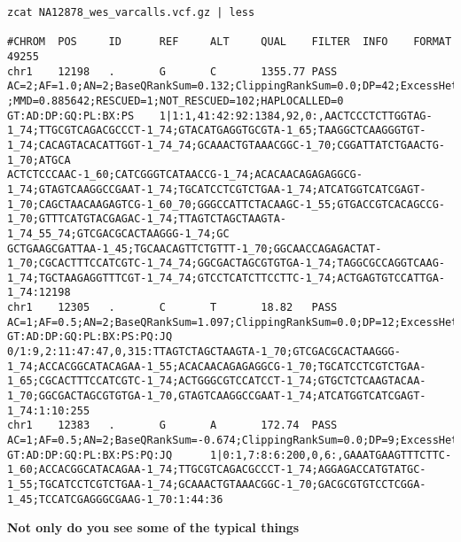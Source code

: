 \documentclass[]{article}
\begin{document}
\begin{verbatim}
zcat NA12878_wes_varcalls.vcf.gz | less

#CHROM  POS     ID      REF     ALT     QUAL    FILTER  INFO    FORMAT  49255
chr1    12198   .       G       C       1355.77 PASS    AC=2;AF=1.0;AN=2;BaseQRankSum=0.132;ClippingRankSum=0.0;DP=42;ExcessHet=3.0103;FS=0.0;MLEAC=2;MLEAF=1.0;MQ=53.23;MQRankSum=1.593;QD=32.28;ReadPosRankSum=1.653;SOR=0.286;MUMAP_REF=3.73913;MUMAP_ALT=24.775;AO=34;RO=0
;MMD=0.885642;RESCUED=1;NOT_RESCUED=102;HAPLOCALLED=0     GT:AD:DP:GQ:PL:BX:PS    1|1:1,41:42:92:1384,92,0:,AACTCCCTCTTGGTAG-1_74;TTGCGTCAGACGCCCT-1_74;GTACATGAGGTGCGTA-1_65;TAAGGCTCAAGGGTGT-1_74;CACAGTACACATTGGT-1_74_74;GCAAACTGTAAACGGC-1_70;CGGATTATCTGAACTG-1_70;ATGCA
ACTCTCCCAAC-1_60;CATCGGGTCATAACCG-1_74;ACACAACAGAGAGGCG-1_74;GTAGTCAAGGCCGAAT-1_74;TGCATCCTCGTCTGAA-1_74;ATCATGGTCATCGAGT-1_70;CAGCTAACAAGAGTCG-1_60_70;GGGCCATTCTACAAGC-1_55;GTGACCGTCACAGCCG-1_70;GTTTCATGTACGAGAC-1_74;TTAGTCTAGCTAAGTA-1_74_55_74;GTCGACGCACTAAGGG-1_74;GC
GCTGAAGCGATTAA-1_45;TGCAACAGTTCTGTTT-1_70;GGCAACCAGAGACTAT-1_70;CGCACTTTCCATCGTC-1_74_74;GGCGACTAGCGTGTGA-1_74;TAGGCGCCAGGTCAAG-1_74;TGCTAAGAGGTTTCGT-1_74_74;GTCCTCATCTTCCTTC-1_74;ACTGAGTGTCCATTGA-1_74:12198
chr1    12305   .       C       T       18.82   PASS    AC=1;AF=0.5;AN=2;BaseQRankSum=1.097;ClippingRankSum=0.0;DP=12;ExcessHet=3.0103;FS=0.0;MLEAC=1;MLEAF=0.5;MQ=51.41;MQRankSum=-0.23;QD=1.71;ReadPosRankSum=-0.253;SOR=0.086;MUMAP_REF=13.6977;MUMAP_ALT=15.6667;AO=2;RO=9;MMD=0.901709;RESCUED=0;NOT_RESCUED=49;HAPLOCALLED=0      GT:AD:DP:GQ:PL:BX:PS:PQ:JQ      0/1:9,2:11:47:47,0,315:TTAGTCTAGCTAAGTA-1_70;GTCGACGCACTAAGGG-1_74;ACCACGGCATACAGAA-1_55;ACACAACAGAGAGGCG-1_70;TGCATCCTCGTCTGAA-1_65;CGCACTTTCCATCGTC-1_74;ACTGGGCGTCCATCCT-1_74;GTGCTCTCAAGTACAA-1_70;GGCGACTAGCGTGTGA-1_70,GTAGTCAAGGCCGAAT-1_74;ATCATGGTCATCGAGT-1_74:1:10:255
chr1    12383   .       G       A       172.74  PASS    AC=1;AF=0.5;AN=2;BaseQRankSum=-0.674;ClippingRankSum=0.0;DP=9;ExcessHet=3.0103;FS=6.021;MLEAC=1;MLEAF=0.5;MQ=49.26;MQRankSum=0.887;QD=21.59;ReadPosRankSum=-0.489;SOR=2.526;MUMAP_REF=7.0;MUMAP_ALT=26.4706;AO=8;RO=0;MMD=0.898793;RESCUED=0;NOT_RESCUED=21;HAPLOCALLED=0       GT:AD:DP:GQ:PL:BX:PS:PQ:JQ      1|0:1,7:8:6:200,0,6:,GAAATGAAGTTTCTTC-1_60;ACCACGGCATACAGAA-1_74;TTGCGTCAGACGCCCT-1_74;AGGAGACCATGTATGC-1_55;TGCATCCTCGTCTGAA-1_74;GCAAACTGTAAACGGC-1_70;GACGCGTGTCCTCGGA-1_45;TCCATCGAGGGCGAAG-1_70:1:44:36
\end{verbatim}

\textbf{Not only do you see some of the typical things}
\end{document}
